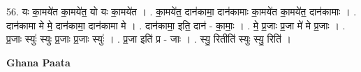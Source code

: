 \documentclass[17pt]{extarticle}
\begin{document}
56. यः का॒मये॑त का॒मये॑त॒ यो यः का॒मये॑त । . का॒मये॑त॒ दान॑कामा॒ दान॑कामाः का॒मये॑त का॒मये॑त॒ दान॑कामाः । . दान॑कामा मे मे॒ दान॑कामा॒ दान॑कामा मे । . दान॑कामा॒ इति॒ दान॑ - का॒माः॒ । . मे॒ प्र॒जाः प्र॒जा मे॑ मे प्र॒जाः । . प्र॒जाः स्युः॑ स्युः प्र॒जाः प्र॒जाः स्युः॑ । . प्र॒जा इति॑ प्र - जाः । . स्यु॒ रितीति॑ स्युः स्यु॒ रिति॑ । \newline

\textbf{Ghana Paata } \newline
\end{document}
